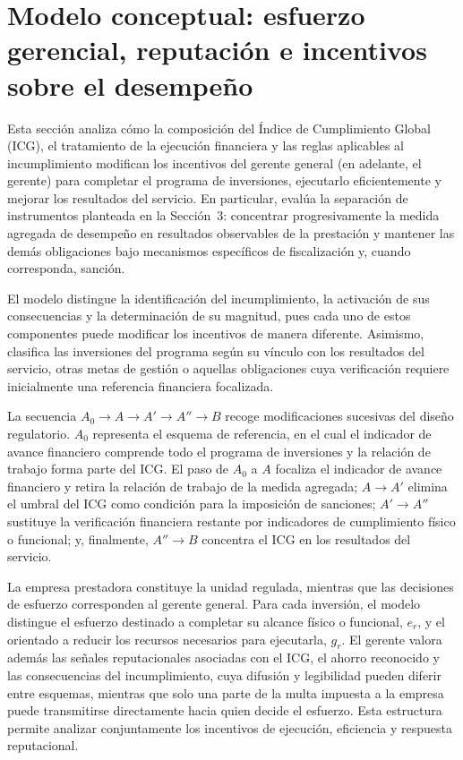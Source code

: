 \section{Modelo conceptual: esfuerzo gerencial, reputación e incentivos sobre el desempeño}

Esta sección analiza cómo la composición del Índice de Cumplimiento Global (ICG), el tratamiento de la ejecución financiera y las reglas aplicables al incumplimiento modifican los incentivos del gerente general (en adelante, el gerente) para completar el programa de inversiones, ejecutarlo eficientemente y mejorar los resultados del servicio. En particular, evalúa la separación de instrumentos planteada en la Sección~3: concentrar progresivamente la medida agregada de desempeño en resultados observables de la prestación y mantener las demás obligaciones bajo mecanismos específicos de fiscalización y, cuando corresponda, sanción.

El modelo distingue la identificación del incumplimiento, la activación de sus consecuencias y la determinación de su magnitud, pues cada uno de estos componentes puede modificar los incentivos de manera diferente. Asimismo, clasifica las inversiones del programa según su vínculo con los resultados del servicio, otras metas de gestión o aquellas obligaciones cuya verificación requiere inicialmente una referencia financiera focalizada.

La secuencia \(A_0\to A\to A'\to A''\to B\) recoge modificaciones sucesivas del diseño regulatorio. \(A_0\) representa el esquema de referencia, en el cual el indicador de avance financiero comprende todo el programa de inversiones y la relación de trabajo forma parte del ICG. El paso de \(A_0\) a \(A\) focaliza el indicador de avance financiero y retira la relación de trabajo de la medida agregada; \(A\to A'\) elimina el umbral del ICG como condición para la imposición de sanciones; \(A'\to A''\) sustituye la verificación financiera restante por indicadores de cumplimiento físico o funcional; y, finalmente, \(A''\to B\) concentra el ICG en los resultados del servicio.

La empresa prestadora constituye la unidad regulada, mientras que las decisiones de esfuerzo corresponden al gerente general. Para cada inversión, el modelo distingue el esfuerzo destinado a completar su alcance físico o funcional, \(e_r\), y el orientado a reducir los recursos necesarios para ejecutarla, \(g_r\). El gerente valora además las señales reputacionales asociadas con el ICG, el ahorro reconocido y las consecuencias del incumplimiento, cuya difusión y legibilidad pueden diferir entre esquemas, mientras que solo una parte de la multa impuesta a la empresa puede transmitirse directamente hacia quien decide el esfuerzo. Esta estructura permite analizar conjuntamente los incentivos de ejecución, eficiencia y respuesta reputacional.

